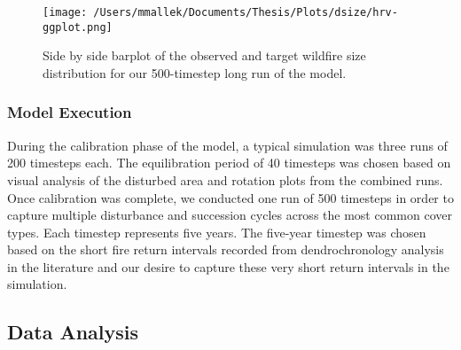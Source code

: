 \begin{figure}[!htbp]
  \centering
    \centering
    \texttt{[image: /Users/mmallek/Documents/Thesis/Plots/dsize/hrv-ggplot.png]}
  \caption{Side by side barplot of the observed and target wildfire size distribution for our 500-timestep long run of the model.}
  \label{fig:dsize}
\end{figure}

\subsubsection{Model Execution}
During the calibration phase of the model, a typical simulation was three runs of 200 timesteps each. The equilibration period of 40 timesteps was chosen based on visual analysis of the disturbed area and rotation plots from the combined runs. Once calibration was complete, we conducted one run of 500 timesteps in order to capture multiple disturbance and succession cycles across the most common cover types. Each timestep represents five years. The five-year timestep was chosen based on the short fire return intervals recorded from dendrochronology analysis in the literature and our desire to capture these very short return intervals in the simulation.

\subsection{Data Analysis}
\label{subsec:dataanalysis}

